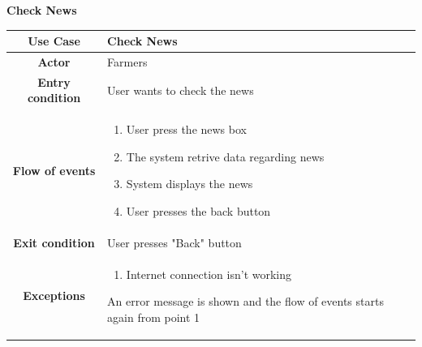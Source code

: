 \documentclass[table, 12pt]{article}
\begin{document}
\begin{itemize}
            \begin{table}[H]
                \item[] \textbf{Check News}
                \item[] 
                \centering
                \begin{tabular}{|c |m{}|}
                    \hline
                    \textbf{Use Case} & Check News\\ \hline
                    \textbf{Actor} & Farmers\\ \hline
                    \textbf{Entry condition} & User wants to check the news\\  \hline
                    \textbf{Flow of events} & \begin{enumerate}
                                                \item User press the news box
                                                \item The system retrive data regarding news 
                                                \item System displays the news
                                                \item User presses the back button
                                            \end{enumerate}\\ \hline
                    \textbf{Exit condition} & User presses "Back" button\\ \hline
                    \textbf{Exceptions} &  \begin{enumerate}
                        \item Internet connection isn't working
                    \end{enumerate}
                    An error message is shown and the flow of events starts again from point 1\\ \hline                    
                \end{tabular}
            \end{table}


\end{itemize}
\end{document}
